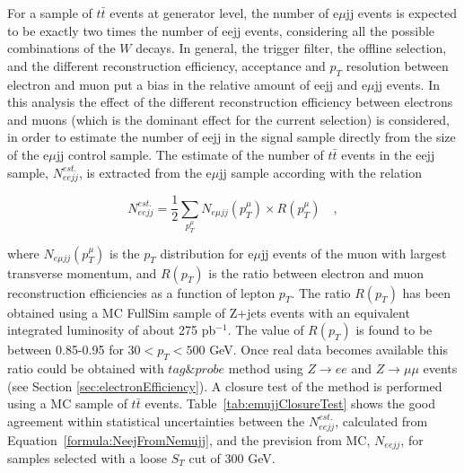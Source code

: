 For a sample of $t\bar{t}$ events at generator level, the number of e$\mu$jj events is expected to be
exactly two times the number of eejj events, considering all the possible combinations of the $W$ decays.
In general, the trigger filter, the offline selection, and the different reconstruction efficiency,
acceptance and $p_{T}$ resolution between electron and muon put a bias in the relative amount of eejj 
and e$\mu$jj events. 
In this analysis the effect of the different reconstruction efficiency between electrons and muons 
(which is the dominant effect for the current selection) 
is considered, in order to estimate the number of eejj in the signal sample directly from 
the size of the e$\mu$jj control sample. The estimate of the number of $t\bar{t}$ events in the eejj sample, 
$N_{eejj}^{est.}$, is extracted from the e$\mu$jj sample according with the relation 

\begin{equation} \label{formula:NeejFromNemujj}
N_{eejj}^{est.} = \frac{1}{2}\sum_{p_{T}^{\mu}} N_{e\mu jj}(p_{T}^{\mu}) \times R(p_{T}^{\mu}) \quad , 
\end{equation}

where $N_{e\mu jj}(p_{T}^{\mu})$ is the $p_{T}$ distribution for e$\mu$jj events of the muon  
with largest transverse momentum, and $R(p_{T})$ is the ratio between electron 
and muon reconstruction efficiencies as a function of lepton $p_{T}$. The ratio $R(p_{T})$ has been obtained 
using a MC FullSim sample of Z+jets events with an equivalent integrated luminosity of about 275 pb$^{-1}$.
The value of $R(p_{T})$ is found to be between 0.85-0.95 for $30 < p_{T} < 500$ GeV.
Once real data becomes available this ratio could be obtained with $tag\&probe$ method using $Z \rightarrow ee$ and 
$Z \rightarrow \mu\mu$ events (see Section \ref{sec:electronEfficiency}).
A closure test of the method is performed using a MC sample of $t\bar{t}$ events. 
Table~\ref{tab:emujjClosureTest} shows the good agreement within statistical uncertainties between 
the $N_{eejj}^{est.}$, calculated from Equation~\ref{formula:NeejFromNemujj}, 
and the prevision from MC, $N_{eejj}$, for samples selected with a loose $S_{T}$ cut of 300 GeV.   

